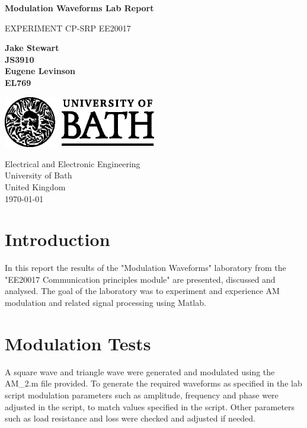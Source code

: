 \documentclass[a4paper]{article}
\begin{document}
\begin{titlepage}
    \begin{center}
        \vspace*{1cm}

        \Huge
        \textbf{Modulation Waveforms Lab Report}

        \vspace{0.5cm}
        \LARGE
        EXPERIMENT CP-SRP
        EE20017
        
        \vspace{1.5cm}

        \textbf{Jake Stewart}\\
        \textbf{JS3910}\\

        \textbf{Eugene Levinson}\\
        \textbf{EL769}\\
        \vspace{0.8cm}

                \vfill
                \includegraphics[width=0.5\textwidth]{university_logo.png}

                \Large
                Electrical and Electronic Engineering\\
                University of Bath\\
                United Kingdom\\
                \today
                

            \end{center}
        \end{titlepage}

        \newpage
        \tableofcontents
        \newpage

        \section{Introduction}
        In this report the results of the "Modulation Waveforms" laboratory from the "EE20017 Communication principles module" are presented, discussed and analysed. The goal of the laboratory was to experiment and experience AM modulation and related signal processing using Matlab.

        \section{Modulation Tests}
        A square wave and triangle wave were generated and modulated using the AM\_2.m file provided. To generate the required waveforms as specified in the lab script modulation parameters such as amplitude, frequency and phase were adjusted in the script, to match values specified in the script. Other parameters such as load resistance and loss were checked and adjusted if needed.
\end{document}
